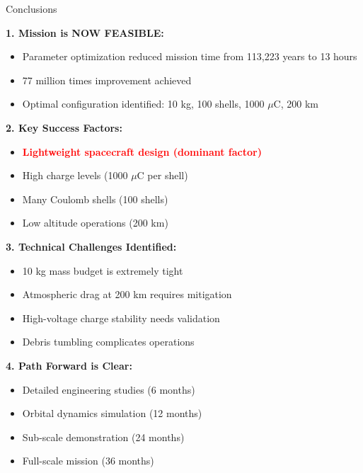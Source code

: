 \documentclass[11pt]{beamer}
\begin{document}
\begin{frame}{Conclusions}

\textbf{1. Mission is NOW FEASIBLE:}
\begin{itemize}
\item Parameter optimization reduced mission time from 113,223 years to 13 hours
\item 77 million times improvement achieved
\item Optimal configuration identified: 10 kg, 100 shells, 1000 $\mu$C, 200 km
\end{itemize}

\vspace{0.2cm}

\textbf{2. Key Success Factors:}
\begin{itemize}
\item \textcolor{red}{\textbf{Lightweight spacecraft design (dominant factor)}}
\item High charge levels (1000 $\mu$C per shell)
\item Many Coulomb shells (100 shells)
\item Low altitude operations (200 km)
\end{itemize}

\vspace{0.2cm}

\textbf{3. Technical Challenges Identified:}
\begin{itemize}
\item 10 kg mass budget is extremely tight
\item Atmospheric drag at 200 km requires mitigation
\item High-voltage charge stability needs validation
\item Debris tumbling complicates operations
\end{itemize}

\vspace{0.2cm}

\textbf{4. Path Forward is Clear:}
\begin{itemize}
\item Detailed engineering studies (6 months)
\item Orbital dynamics simulation (12 months)
\item Sub-scale demonstration (24 months)
\item Full-scale mission (36 months)
\end{itemize}

\end{frame}
\end{document}

